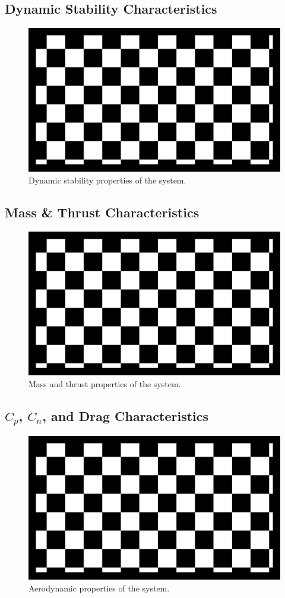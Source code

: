\documentclass[12pt]{article}
\begin{document}
\subsection{Dynamic Stability Characteristics}
\begin{figure}
    \centering
    \includegraphics[width=.8\textwidth]{media/dynstab.png}
    \caption{Dynamic stability properties of the system.}
\end{figure}
\subsection{Mass \& Thrust Characteristics}
\begin{figure}
    \centering
    \includegraphics[width=.8\textwidth]{media/massthrust.png}
    \caption{Mass and thrust properties of the system.}
\end{figure}
\subsection{$C_p$, $C_n$, and Drag Characteristics}
\begin{figure}
    \centering
    \includegraphics[width=.8\textwidth]{media/aero1.png}
    \caption{Aerodynamic properties of the system.}
\end{figure}
\end{document}

